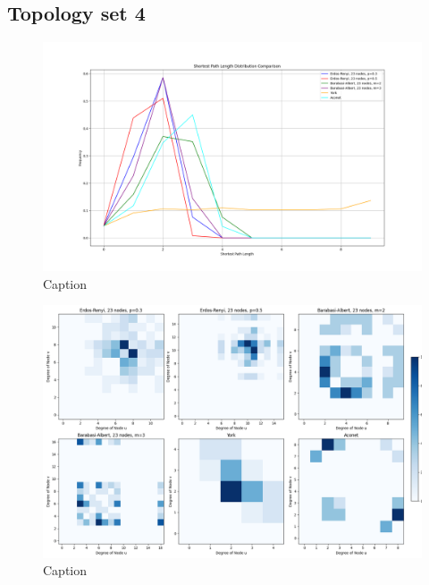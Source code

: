 \subsection{Topology set 4}
\begin{figure}
    \centering
    \includegraphics[width=0.9\linewidth]{images/FINAL-TOPO-COMP/line-23.png}
    \caption{Caption}
    \label{fig:enter-label}
\end{figure}

\begin{figure}
    \centering
    \includegraphics[width=0.9\linewidth]{images/FINAL-TOPO-COMP/Degree-correlation-matrices/23-matrix.png}
    \caption{Caption}
    \label{fig:enter-label}
\end{figure}

